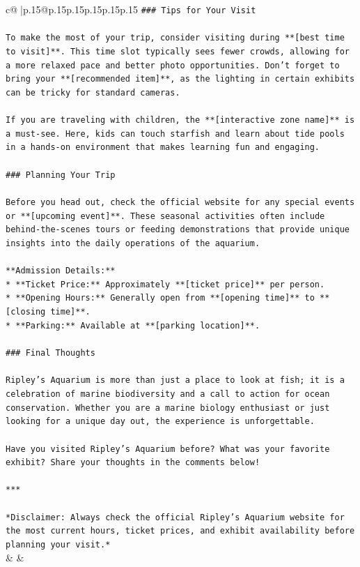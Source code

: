 \documentclass{article}
\begin{document}
{\begin{supertabular}{c@{$\;$}|p{.15\linewidth}@{}p{.15\linewidth}p{.15\linewidth}p{.15\linewidth}p{.15\linewidth}p{.15\linewidth}}
{{{\texttt{\#\#\# Tips for Your Visit} \\
\\ 
\texttt{To make the most of your trip, consider visiting during **{[}best time to visit{]}**. This time slot typically sees fewer crowds, allowing for a more relaxed pace and better photo opportunities. Don’t forget to bring your **{[}recommended item{]}**, as the lighting in certain exhibits can be tricky for standard cameras.} \\
\\ 
\texttt{If you are traveling with children, the **{[}interactive zone name{]}** is a must{-}see. Here, kids can touch starfish and learn about tide pools in a hands{-}on environment that makes learning fun and engaging.} \\
\\ 
\texttt{\#\#\# Planning Your Trip} \\
\\ 
\texttt{Before you head out, check the official website for any special events or **{[}upcoming event{]}**. These seasonal activities often include behind{-}the{-}scenes tours or feeding demonstrations that provide unique insights into the daily operations of the aquarium.} \\
\\ 
\texttt{**Admission Details:**} \\
\texttt{*   **Ticket Price:** Approximately **{[}ticket price{]}** per person.} \\
\texttt{*   **Opening Hours:** Generally open from **{[}opening time{]}** to **{[}closing time{]}**.} \\
\texttt{*   **Parking:** Available at **{[}parking location{]}**.} \\
\\ 
\texttt{\#\#\# Final Thoughts} \\
\\ 
\texttt{Ripley’s Aquarium is more than just a place to look at fish; it is a celebration of marine biodiversity and a call to action for ocean conservation. Whether you are a marine biology enthusiast or just looking for a unique day out, the experience is unforgettable.} \\
\\ 
\texttt{Have you visited Ripley’s Aquarium before? What was your favorite exhibit? Share your thoughts in the comments below!} \\
\\ 
\texttt{***} \\
\\ 
\texttt{*Disclaimer: Always check the official Ripley’s Aquarium website for the most current hours, ticket prices, and exhibit availability before planning your visit.*} \\
            }
        }
    }
    & & \\ \\


\end{supertabular}}
\end{document}
